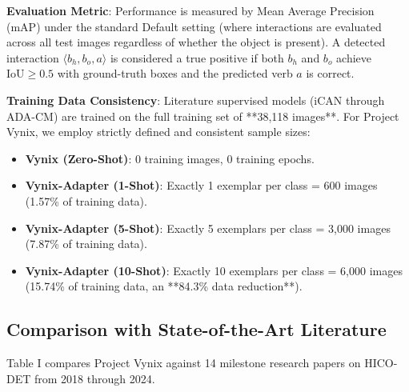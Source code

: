 \documentclass[conference]{IEEEtran}
\begin{document}
\textbf{Evaluation Metric}: Performance is measured by Mean Average Precision (mAP) under the standard Default setting (where interactions are evaluated across all test images regardless of whether the object is present). A detected interaction $\langle b_h, b_o, a \rangle$ is considered a true positive if both $b_h$ and $b_o$ achieve $\text{IoU} \ge 0.5$ with ground-truth boxes and the predicted verb $a$ is correct.

\textbf{Training Data Consistency}: Literature supervised models (iCAN through ADA-CM) are trained on the full training set of **38,118 images**. For Project Vynix, we employ strictly defined and consistent sample sizes:
\begin{itemize}
    \item \textbf{Vynix (Zero-Shot)}: 0 training images, 0 training epochs.
    \item \textbf{Vynix-Adapter (1-Shot)}: Exactly 1 exemplar per class = 600 images (1.57\% of training data).
    \item \textbf{Vynix-Adapter (5-Shot)}: Exactly 5 exemplars per class = 3,000 images (7.87\% of training data).
    \item \textbf{Vynix-Adapter (10-Shot)}: Exactly 10 exemplars per class = 6,000 images (15.74\% of training data, an **84.3\% data reduction**).
\end{itemize}

\subsection{Comparison with State-of-the-Art Literature}
Table I compares Project Vynix against 14 milestone research papers on HICO-DET from 2018 through 2024.
\end{document}
